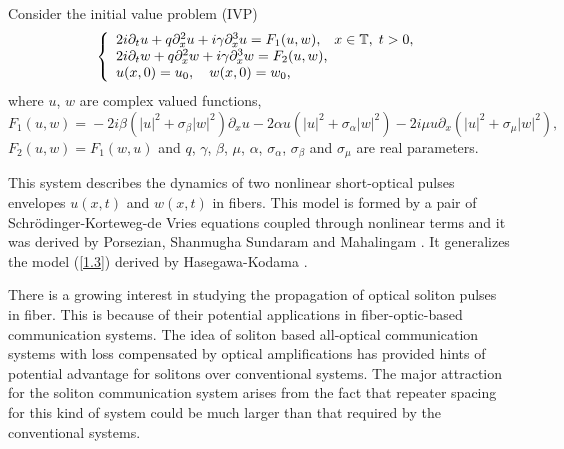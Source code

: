 \documentclass[reqno]{amsart}
\numberwithin{equation}{section}
\begin{document}
Consider the initial value problem (IVP)
\begin{equation}\label{1.1}
\left\{
\begin{array}
[c]{l}2i\partial_{t}u+q\partial_{x}^{2}u+i\gamma\partial_{x}^{3}u=F_{1}(u,w),
\; \;\;x\in\mathbb{T}, \;t>0,\\
2i\partial_{t}w+q\partial_{x}^{2}w+i\gamma\partial_{x}^{3}w=F_{2}(u,w)\text{,}\\
u(x,0)=u_{0},\text{\hskip10pt} w(x,0)=w_{0}\text{,}\end{array}
\right.
\end{equation}
where $u$, $w$ are complex valued functions,
$$
F_{1}(u,w)\!=\!-2i\beta(|u|^2+\sigma_{\beta}|w|^2)  \partial_{x}u-2\alpha u(|u| ^{2}+\sigma_{\alpha}|w| ^{2})-2i\mu u\partial_{x}(|u|^2+\sigma_{\mu}|w| ^{2}),
$$
$F_{2}(u,w)=F_{1}(w,u)$ and $q$, $\gamma$, $\beta$, $\mu$, $\alpha$, $\sigma_{\alpha}$,
$\sigma_{\beta}$ and $\sigma _{\mu}$ are real parameters.

This system describes the dynamics of two nonlinear short-optical
pulses envelopes $u(x,t)$ and $w(x,t)$ in fibers. This model
is formed by a pair of Schr\"odinger-Korteweg-de Vries equations
coupled through nonlinear terms and it was derived by Porsezian,
Shanmugha Sundaram and Mahalingam \cite{31}. It generalizes
the model (\ref{1.3}) derived by Hasegawa-Kodama \cite{14}.

There is a growing interest in studying the propagation of optical
soliton pulses in fiber. This is because of their potential
applications in fiber-optic-based communication systems. The idea
of soliton based all-optical communication systems with loss
compensated by optical amplifications has provided hints of
potential advantage for solitons over conventional systems. The
major attraction for the soliton communication system arises from
the fact that repeater spacing for this kind of system could be
much larger than that required by the conventional systems.
\end{document}
